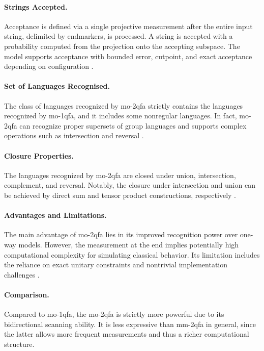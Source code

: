 \paragraph{Strings Accepted.} Acceptance is defined via a single projective measurement after the entire input string, delimited by endmarkers, is processed. A string is accepted with a probability computed from the projection onto the accepting subspace. The model supports acceptance with bounded error, cutpoint, and exact acceptance depending on configuration \cite{xi2008some}.

\paragraph{Set of Languages Recognised.} The class of languages recognized by \gls{mo-2qfa} strictly contains the languages recognized by \gls{mo-1qfa}, and it includes some nonregular languages. In fact, \gls{mo-2qfa} can recognize proper supersets of group languages and supports complex operations such as intersection and reversal \cite{xi2008some}.

\paragraph{Closure Properties.} The languages recognized by \gls{mo-2qfa} are closed under union, intersection, complement, and reversal. Notably, the closure under intersection and union can be achieved by direct sum and tensor product constructions, respectively \cite{xi2008some}.

\paragraph{Advantages and Limitations.} The main advantage of \gls{mo-2qfa} lies in its improved recognition power over one-way models. However, the measurement at the end implies potentially high computational complexity for simulating classical behavior. Its limitation includes the reliance on exact unitary constraints and nontrivial implementation challenges \cite{xi2008some}.

\paragraph{Comparison.} Compared to \gls{mo-1qfa}, the \gls{mo-2qfa} is strictly more powerful due to its bidirectional scanning ability. It is less expressive than \gls{mm-2qfa} in general, since the latter allows more frequent measurements and thus a richer computational structure.

